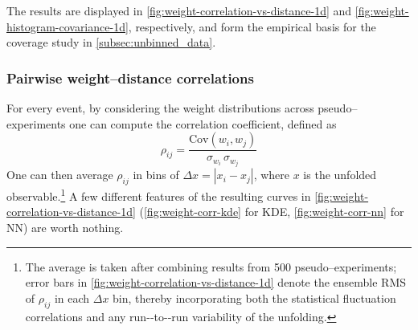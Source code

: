 \addtocounter{footnote}{-2}

        The results are displayed in \cref{fig:weight-correlation-vs-distance-1d} and \cref{fig:weight-histogram-covariance-1d}, respectively, and form the empirical basis for the coverage study in \cref{subsec:unbinned_data}.
        
        \subsubsection{Pairwise weight--distance correlations}
        For every event, by considering the weight distributions across pseudo--experiments one can compute the correlation coefficient, defined as
        \[
            \rho_{ij} = \frac{\mathrm{Cov}(w_i,w_j)}{\sigma_{w_i}\,\sigma_{w_j}}
        \]
        One can then average $\rho_{ij}$ in bins of $\Delta x = |x_i-x_j|$, where $x$ is the unfolded observable.\footnote{
            The average is taken after combining results from 500 pseudo–experiments; error bars in \cref{fig:weight-correlation-vs-distance-1d} denote the ensemble RMS of $\rho_{ij}$ in each $\Delta x$ bin, thereby incorporating both the statistical fluctuation correlations and any run-‐to-‐run variability of the unfolding.
            }
            A few different features of the resulting curves in \cref{fig:weight-correlation-vs-distance-1d} (\cref{fig:weight-corr-kde} for {KDE}, \cref{fig:weight-corr-nn} for {NN}) are worth nothing.
